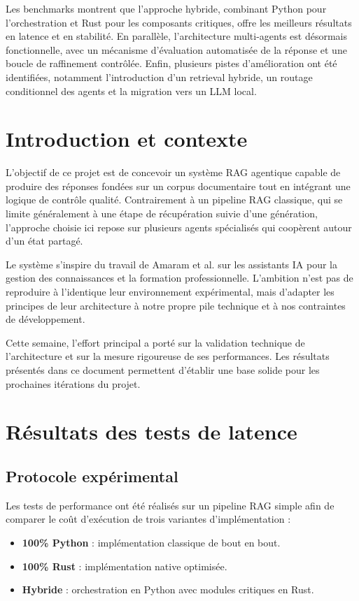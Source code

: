 \documentclass[12pt,a4paper]{report}
\begin{document}
Les benchmarks montrent que l'approche hybride, combinant Python pour l'orchestration et Rust pour les composants critiques, offre les meilleurs résultats en latence et en stabilité. En parallèle, l'architecture multi-agents est désormais fonctionnelle, avec un mécanisme d'évaluation automatisée de la réponse et une boucle de raffinement contrôlée. Enfin, plusieurs pistes d'amélioration ont été identifiées, notamment l'introduction d'un retrieval hybride, un routage conditionnel des agents et la migration vers un LLM local.

\chapter{Introduction et contexte}

L'objectif de ce projet est de concevoir un système RAG agentique capable de produire des réponses fondées sur un corpus documentaire tout en intégrant une logique de contrôle qualité. Contrairement à un pipeline RAG classique, qui se limite généralement à une étape de récupération suivie d'une génération, l'approche choisie ici repose sur plusieurs agents spécialisés qui coopèrent autour d'un état partagé.

Le système s'inspire du travail de Amaram et al. sur les assistants IA pour la gestion des connaissances et la formation professionnelle. L'ambition n'est pas de reproduire à l'identique leur environnement expérimental, mais d'adapter les principes de leur architecture à notre propre pile technique et à nos contraintes de développement.

Cette semaine, l'effort principal a porté sur la validation technique de l'architecture et sur la mesure rigoureuse de ses performances. Les résultats présentés dans ce document permettent d'établir une base solide pour les prochaines itérations du projet.

\chapter{Résultats des tests de latence}

\section{Protocole expérimental}

Les tests de performance ont été réalisés sur un pipeline RAG simple afin de comparer le coût d'exécution de trois variantes d'implémentation :

\begin{itemize}[leftmargin=1.2cm]
  \item \textbf{100\% Python} : implémentation classique de bout en bout.
  \item \textbf{100\% Rust} : implémentation native optimisée.
  \item \textbf{Hybride} : orchestration en Python avec modules critiques en Rust.
\end{itemize}
\end{document}

